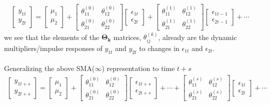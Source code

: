 \documentclass[a4paper,11pt,listof=nochaptergap,oneside,pointednumbers,bibtotoc,bigheadings,liststotoc]{scrbook}
\newcommand{\vect}[1]{\boldsymbol{\mathbf{#1}}}
\begin{document}
\begin{equation} \label{eq:svar9}
\begin{split}
	\begin{bmatrix}
    	y_{1t} \\
    	y_{2t}
 	\end{bmatrix} 
	=
	\begin{bmatrix}
    	\mu_1 \\
    	\mu_2
 	\end{bmatrix} + 
	\begin{bmatrix}
    	\theta_{11}^{(0)} & \theta_{12}^{(0)}\\
    	\theta_{21}^{(0)} & \theta_{22}^{(0)}
 	\end{bmatrix} 
	\begin{bmatrix}
    	\epsilon_{1t} \\
	\epsilon_{2t}
 	\end{bmatrix} + 
	\begin{bmatrix}
    	\theta_{11}^{(1)} & \theta_{12}^{(1)}\\
    	\theta_{21}^{(1)} & \theta_{22}^{(1)}
 	\end{bmatrix} 
	\begin{bmatrix}
    	\epsilon_{1t-1} \\
	\epsilon_{2t-1}
 	\end{bmatrix} + \cdots 
\end{split}								
\end{equation}
we see that the elements of the $\vect{\Theta_k}$ matrices, $\theta_{ij}^{(k)}$, already are the dynamic multipliers/impulse responses of $y_{1t}$ and $y_{2t}$ to changes in $\epsilon_{1t}$ and $\epsilon_{2t}$.\\
\\
Generalizing the above SMA($\infty$) representation to time $t+s$
\begin{equation} \label{eq:svar10}
\begin{split}
	\begin{bmatrix}
    	y_{1t+s} \\
    	y_{2t+s}
 	\end{bmatrix} 
	=
	\begin{bmatrix}
    	\mu_1 \\
    	\mu_2
 	\end{bmatrix} + 
	\begin{bmatrix}
    	\theta_{11}^{(0)} & \theta_{12}^{(0)}\\
    	\theta_{21}^{(0)} & \theta_{22}^{(0)}
 	\end{bmatrix} 
	\begin{bmatrix}
    	\epsilon_{1t + s} \\
	\epsilon_{2t+s}
 	\end{bmatrix} + \cdots +
	\begin{bmatrix}
    	\theta_{11}^{(s)} & \theta_{12}^{(s)}\\
    	\theta_{21}^{(s)} & \theta_{22}^{(s)}
 	\end{bmatrix} 
	\begin{bmatrix}
    	\epsilon_{1t} \\
	\epsilon_{2t}
 	\end{bmatrix} + \cdots 
\end{split}								
\end{equation}
\end{document}
